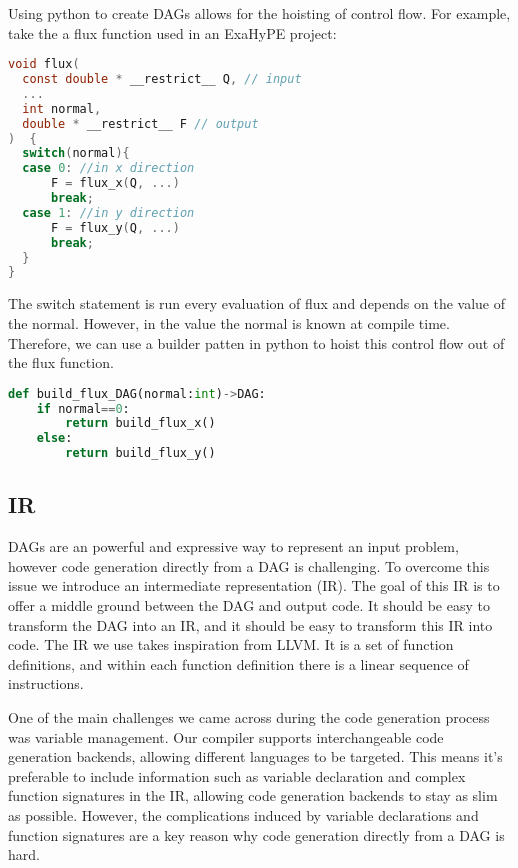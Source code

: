 Using python to create DAGs allows for the hoisting of control flow.
For example, take the a flux function used in an ExaHyPE project:
\begin{lstlisting}[language=c]
void flux(
  const double * __restrict__ Q, // input
  ...
  int normal,
  double * __restrict__ F // output
)  {
  switch(normal){  
  case 0: //in x direction
	  F = flux_x(Q, ...)
	  break;
  case 1: //in y direction
	  F = flux_y(Q, ...)
	  break;
  }  
}
\end{lstlisting}
The switch statement is run every evaluation of flux and depends on the value of the normal.
However, in  the value the normal is known at compile time.
Therefore, we can use a builder patten in python to hoist this control flow out of the flux function.
\begin{lstlisting}[language=python]
def build_flux_DAG(normal:int)->DAG:
    if normal==0:
        return build_flux_x()
    else:
        return build_flux_y()
\end{lstlisting}




\subsection{IR} \label{sec:IR}


DAGs are an powerful and expressive way to represent an input problem, however code generation directly from a DAG is challenging.
To overcome this issue we introduce an intermediate representation (IR).
The goal of this IR is to offer a middle ground between the DAG and output code.
It should be easy to transform the DAG into an IR, and it should be easy to transform this IR into code.
The IR we use takes inspiration from LLVM.
It is a set of function definitions, and within each function definition there is a linear sequence of instructions.

One of the main challenges we came across during the code generation process was variable management.
Our compiler supports interchangeable code generation backends, allowing different languages to be targeted.
This means it's preferable to include information such as variable declaration and complex function signatures in the IR, allowing code generation backends to stay as slim as possible.
However, the complications induced by variable declarations and function signatures are a key reason why code generation directly from a DAG is hard.   


